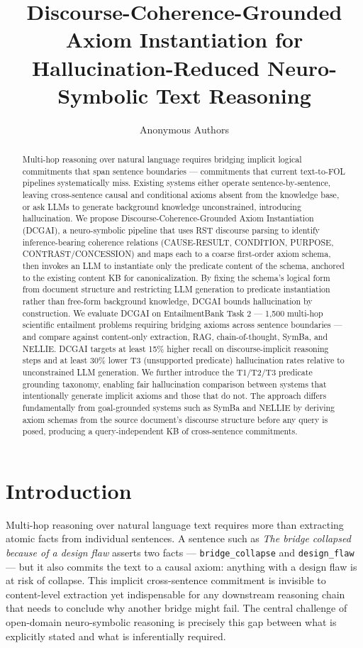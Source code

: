 \documentclass[11pt,letterpaper]{article}
\title{\textbf{Discourse-Coherence-Grounded Axiom Instantiation for\\
Hallucination-Reduced Neuro-Symbolic Text Reasoning}}
\author{
Anonymous Authors
}
\date{}
\begin{document}
\maketitle

\begin{abstract}
Multi-hop reasoning over natural language requires bridging implicit logical commitments that span sentence boundaries ---
commitments that current text-to-FOL pipelines systematically miss. Existing systems either operate sentence-by-sentence,
leaving cross-sentence causal and conditional axioms absent from the knowledge base, or ask LLMs to generate background
knowledge unconstrained, introducing hallucination. We propose Discourse-Coherence-Grounded Axiom Instantiation (DCGAI),
a neuro-symbolic pipeline that uses RST discourse parsing to identify inference-bearing coherence relations (CAUSE-RESULT,
CONDITION, PURPOSE, CONTRAST/CONCESSION) and maps each to a coarse first-order axiom schema, then invokes an LLM to instantiate
only the predicate content of the schema, anchored to the existing content KB for canonicalization. By fixing the schema's
logical form from document structure and restricting LLM generation to predicate instantiation rather than free-form background
knowledge, DCGAI bounds hallucination by construction. We evaluate DCGAI on EntailmentBank Task 2 --- 1,500 multi-hop scientific
entailment problems requiring bridging axioms across sentence boundaries --- and compare against content-only extraction,
RAG, chain-of-thought, SymBa, and NELLIE. DCGAI targets at least 15\% higher recall on discourse-implicit reasoning steps
and at least 30\% lower T3 (unsupported predicate) hallucination rates relative to unconstrained LLM generation. We further
introduce the T1/T2/T3 predicate grounding taxonomy, enabling fair hallucination comparison between systems that intentionally
generate implicit axioms and those that do not. The approach differs fundamentally from goal-grounded systems such as SymBa
and NELLIE by deriving axiom schemas from the source document's discourse structure before any query is posed, producing
a query-independent KB of cross-sentence commitments.
\end{abstract}

\section{Introduction}

Multi-hop reasoning over natural language text requires more than extracting atomic facts from individual sentences. A sentence
such as \textit{The bridge collapsed because of a design flaw} asserts two facts --- \texttt{bridge\_collapse} and
\texttt{design\_flaw} --- but it also commits the text to a causal axiom: anything with a design flaw is at risk of
collapse. This implicit cross-sentence commitment is invisible to content-level extraction yet indispensable for any
downstream reasoning chain that needs to conclude why another bridge might fail. The central challenge of open-domain
neuro-symbolic reasoning is precisely this gap between what is explicitly stated and what is inferentially required.
\end{document}
